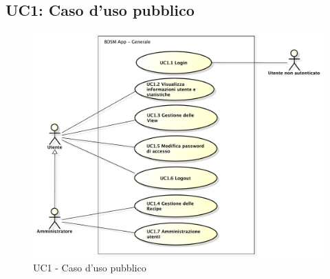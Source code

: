 \subsection{UC1: Caso d'uso pubblico}

\begin{figure}[htbp]
    \centering
    \centerline{\includegraphics[scale=0.5]{./images/UC1.pdf}}
    \caption{UC1 - Caso d'uso pubblico}
\end{figure}

